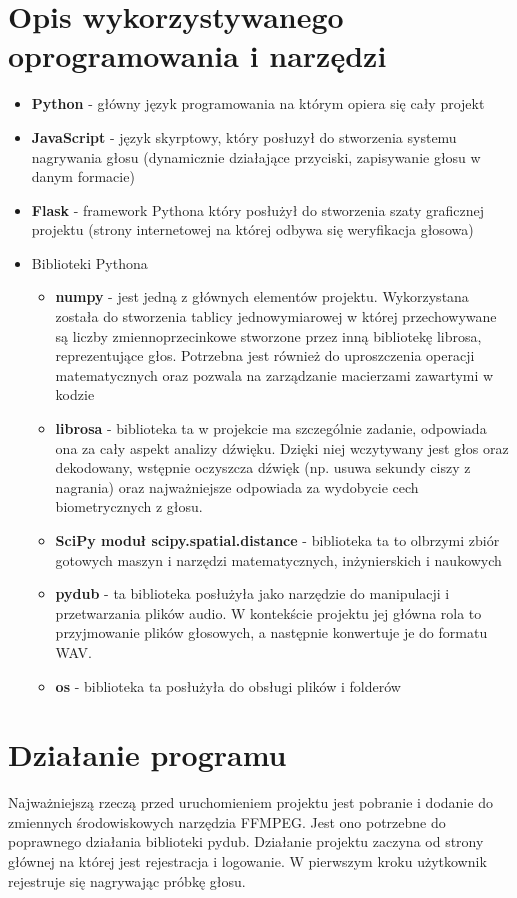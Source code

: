 \section{Opis wykorzystywanego oprogramowania i narzędzi}
\begin{itemize}
	\item \textbf{Python} - główny język programowania na którym opiera się cały projekt
	\item \textbf{JavaScript} - język skyrptowy, który posłuzył do stworzenia systemu nagrywania głosu (dynamicznie działające przyciski, zapisywanie głosu w danym formacie)
	\item \textbf{Flask} - framework Pythona który posłużył do stworzenia szaty graficznej projektu (strony internetowej na której odbywa się weryfikacja głosowa)
	\item Biblioteki Pythona
	\begin{itemize}
		\item \textbf{numpy} - jest jedną z głównych elementów projektu. Wykorzystana została do stworzenia tablicy jednowymiarowej w której przechowywane są liczby zmiennoprzecinkowe stworzone przez inną bibliotekę librosa, reprezentujące głos. Potrzebna jest również do uproszczenia operacji matematycznych oraz pozwala na zarządzanie macierzami zawartymi w kodzie
		\item \textbf{librosa} - biblioteka ta w projekcie ma szczególnie zadanie, odpowiada ona za cały aspekt analizy dźwięku. Dzięki niej wczytywany jest głos oraz dekodowany, wstępnie oczyszcza dźwięk (np. usuwa sekundy ciszy z nagrania) oraz najważniejsze odpowiada za wydobycie cech biometrycznych z głosu.
		\item \textbf{SciPy  moduł scipy.spatial.distance} - biblioteka ta to olbrzymi zbiór gotowych maszyn i narzędzi matematycznych, inżynierskich i naukowych
		\item \textbf{pydub} - ta biblioteka posłużyła jako narzędzie do manipulacji i przetwarzania plików audio. W kontekście projektu jej główna rola to przyjmowanie plików głosowych, a następnie konwertuje je do formatu WAV. 
		\item \textbf{os} - biblioteka ta posłużyła do obsługi plików i folderów
		
	\end{itemize}	
\end{itemize}	



\section{Działanie programu}
Najważniejszą rzeczą przed uruchomieniem projektu jest pobranie i dodanie do zmiennych środowiskowych narzędzia FFMPEG. Jest ono potrzebne do poprawnego działania biblioteki pydub.
\newline
Działanie projektu zaczyna od strony głównej na której jest rejestracja i logowanie. W pierwszym kroku użytkownik rejestruje się nagrywając próbkę głosu. 

